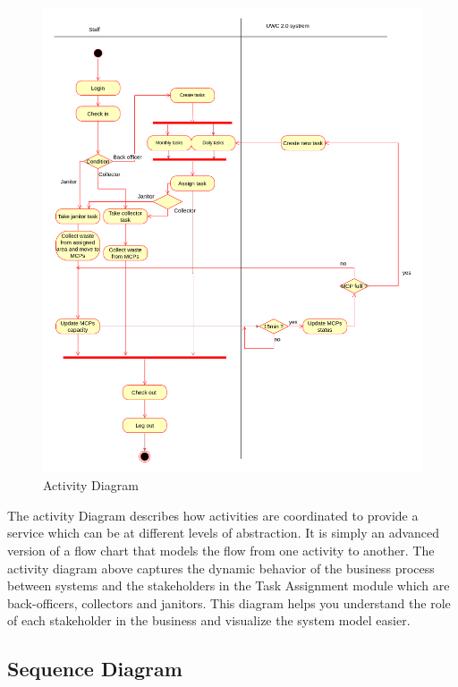 \documentclass[a4paper, 13pt]{article}
\begin{document}
\begin{figure}[!ht]
        \centering
        \includegraphics[scale=0.4]{system-modeling/diagramActivity.png}
        \caption{Activity Diagram}
        \label{fig:my_label}
    \end{figure}
\begin{tcolorbox}[colback=blue!5!white,colframe=blue!75!black]
The activity Diagram describes how activities are coordinated to provide a service which can be at different levels of abstraction. It is simply an advanced version of a flow chart that models the flow from one activity to another. The activity diagram above captures the dynamic behavior of the business process between systems and the stakeholders in the Task Assignment module which are back-officers, collectors and janitors. This diagram helps you understand the role of each stakeholder in the business and visualize the system model easier.
\end{tcolorbox}
\newpage
\subsection{Sequence Diagram}
\end{document}
